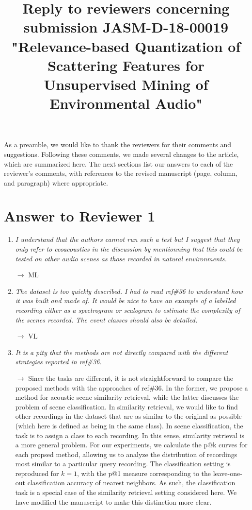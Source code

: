 \documentclass[10pt]{article}
\title{Reply to reviewers concerning submission JASM-D-18-00019 "Relevance-based Quantization of Scattering Features for Unsupervised Mining of Environmental Audio"}
\begin{document}
\maketitle

As a preamble, we would like to thank the reviewers for their comments and suggestions. Following these comments, we made several changes to the article, which are summarized here. The next sections list our answers to each of the reviewer’s comments, with references to the revised manuscript (page, column, and paragraph) where appropriate.

\section{Answer to Reviewer 1}

\begin{enumerate}

\item \emph{I understand that the authors cannot run such a test but I suggest that they only refer to ecoacoustics in the discussion by mentionning that this could be tested on other audio scenes as those recorded in natural environments.}

$\rightarrow$ ML

\item \emph{The dataset is too quickly described. I had to read ref\#36 to understand how it was built and made of. It would be nice to have an example of a labelled recording either as a spectrogram or scalogram to estimate the complexity of the scenes recorded. The event classes should also be detailed.}

$\rightarrow$ VL

\item \emph{It is a pity that the methods are not directly compared with the different strategies reported in ref\#36.}

$\rightarrow$
Since the tasks are different, it is not straightforward to compare the proposed methods with the approaches of ref\#36. In the former, we propose a method for acoustic scene similarity retrieval, while the latter discusses the problem of scene classification. In similarity retrieval, we would like to find other recordings in the dataset that are as similar to the original as possible (which here is defined as being in the same class). In scene classification, the task is to assign a class to each recording. In this sense, similarity retrieval is a more general problem. For our experiments, we calculate the p@k curves for each propsed method, allowing us to analyze the distribution of recordings most similar to a particular query recording. The classification setting is reproduced for $k = 1$, with the p@1 measure corresponding to the leave-one-out classification accuracy of nearest neighbors. As such, the classification task is a special case of the similarity retrieval setting considered here. We have modified the manuscript to make this distinction more clear.


\end{enumerate}
\end{document}
